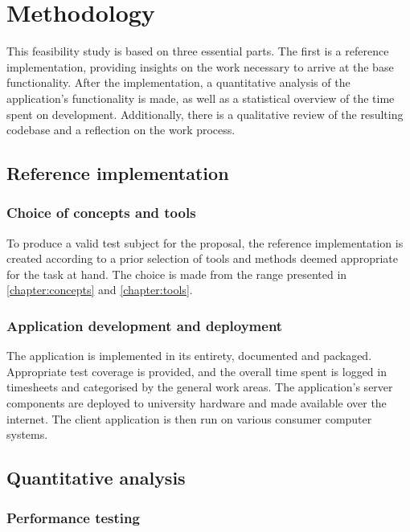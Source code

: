 \chapter{Methodology}
\label{chapter:methodology}

This feasibility study is based on three essential parts. The first is a reference implementation, providing insights on the work necessary to arrive at the base functionality. After the implementation, a quantitative analysis of the application's functionality is made, as well as a statistical overview of the time spent on development. Additionally, there is a qualitative review of the resulting codebase and a reflection on the work process.

\section{Reference implementation}

\subsection{Choice of concepts and tools}

To produce a valid test subject for the proposal, the reference implementation is created according to a prior selection of tools and methods deemed appropriate for the task at hand. The choice is made from the range presented in \autoref{chapter:concepts} and \autoref{chapter:tools}.

\subsection{Application development and deployment}

The application is implemented in its entirety, documented and packaged. Appropriate test coverage is provided, and the overall time spent is logged in timesheets and categorised by the general work areas. The application's server components are deployed to university hardware and made available over the internet. The client application is then run on various consumer computer systems.

\section{Quantitative analysis}

\subsection{Performance testing}

